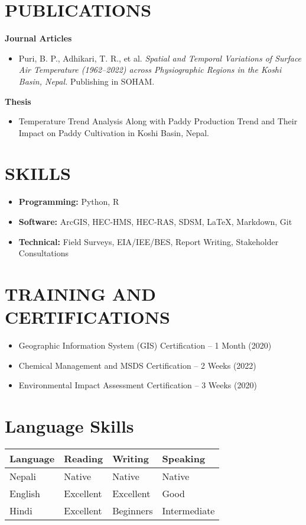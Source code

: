 \documentclass[a4paper,9pt]{extarticle}
\begin{document}
\section*{PUBLICATIONS}
\noindent
\textbf{Journal Articles}
\begin{itemize}
    \item Puri, B. P., Adhikari, T. R., et al. \textit{Spatial and Temporal Variations of Surface Air Temperature (1962–2022) across Physiographic Regions in the Koshi Basin, Nepal.} Publishing in SOHAM.
\end{itemize}

\noindent
\textbf{Thesis}
\begin{itemize}
    \item Temperature Trend Analysis Along with Paddy Production Trend and Their Impact on Paddy Cultivation in Koshi Basin, Nepal.

\end{itemize}

\section*{SKILLS}
\begin{itemize}
    \item \textbf{Programming:} Python, R
    \item \textbf{Software:} ArcGIS, HEC-HMS, HEC-RAS, SDSM, LaTeX, Markdown, Git
    \item \textbf{Technical:} Field Surveys, EIA/IEE/BES, Report Writing, Stakeholder Consultations
\end{itemize}

\section*{TRAINING AND CERTIFICATIONS}
\begin{itemize}
    \item Geographic Information System (GIS) Certification – 1 Month (2020)
    \item Chemical Management and MSDS Certification – 2 Weeks (2022)
    \item Environmental Impact Assessment Certification – 3 Weeks (2020)
\end{itemize}

\section*{Language Skills}

\noindent
\begin{tabularx}{\textwidth}{|l|X|X|X|}
\hline
\textbf{Language} & \textbf{Reading} & \textbf{Writing} & \textbf{Speaking} \\ \hline
Nepali & Native & Native & Native \\ \hline
English & Excellent & Excellent & Good \\ \hline
Hindi & Excellent & Beginners & Intermediate \\ \hline
\end{tabularx}
\end{document}
